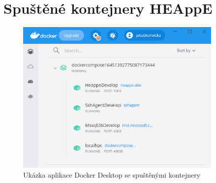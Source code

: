 \chapter{Spuštěné kontejnery HEAppE}
\begin{figure}[!h]
	\centering
	\includegraphics[width=0.9\textwidth]{Figures/docker-desktop.png}
	\caption{Ukázka aplikace Docker Desktop se spuštěnými kontejnery}
    \label{fig:WritingThesis}
\end{figure}
